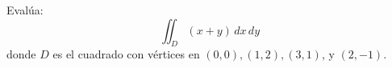 Evalúa: 
\[\iint_D (x+y) \, dx \, dy\]
donde $D$ es el cuadrado con vértices en $(0,0),(1,2),(3,1)$, y $(2,-1)$.

